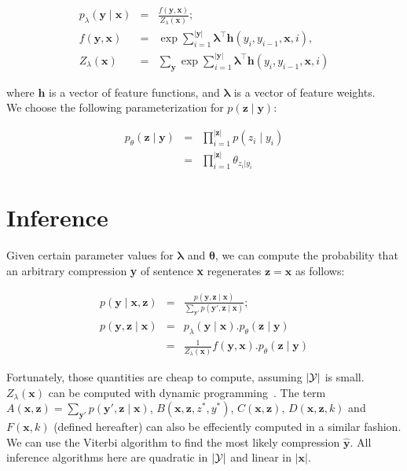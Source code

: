 \documentclass[11pt,onecolumn]{article}
\begin{document}
\begin{eqnarray}
p_\lambda(\mathbf{y}\mid\mathbf{x}) &=& \frac{f(\mathbf{y}, \mathbf{x})}{Z_\lambda(\mathbf{x})}; \\
f(\mathbf{y}, \mathbf{x}) &=& \exp \sum_{i=1}^{|\mathbf{y}|} \boldsymbol{\lambda}^\top \mathbf{h}(y_i, y_{i-1}, \mathbf{x}, i), \\
Z_\lambda(\mathbf{x}) &=& \sum_\mathbf{y} \exp \sum_{i=1}^{|\mathbf{y}|} \boldsymbol{\lambda}^\top \mathbf{h}(y_i, y_{i-1}, \mathbf{x}, i)
\end{eqnarray}

where $\mathbf{h}$ is a vector of feature functions, and $\boldsymbol{\lambda}$ is a vector of feature weights.\\

We choose the following parameterization for $p(\mathbf{z} \mid \mathbf{y})$:

\begin{eqnarray}
p_\theta(\mathbf{z} \mid \mathbf{y}) &=& \prod_{i=1}^{|\mathbf{z}|} p(z_i\mid y_i) \\
 &=& \prod_{i=1}^{|\mathbf{z}|} \theta_{z_i|y_i}
\end{eqnarray}

\section{Inference}
\label{sec:inference}
Given certain parameter values for $\boldsymbol{\lambda}$ and $\boldsymbol{\theta}$, we can compute the probability that an arbitrary compression \textbf{y} of sentence \textbf{x} regenerates $\mathbf{z} = \mathbf{x}$ as follows:

\begin{eqnarray}
p(\mathbf{y}\mid\mathbf{x}, \mathbf{z}) &=& \frac{p(\mathbf{y}, \mathbf{z} \mid \mathbf{x})}{\sum_{\mathbf{y'}} p(\mathbf{y'}, \mathbf{z} \mid \mathbf{x})}; \\
p(\mathbf{y}, \mathbf{z} \mid \mathbf{x}) &=& p_\lambda(\mathbf{y}\mid\mathbf{x}).p_\theta(\mathbf{z}\mid\mathbf{y}) \\
&=& \frac{1}{Z_\lambda(\mathbf{x})}f(\mathbf{y}, \mathbf{x}).p_\theta(\mathbf{z}\mid\mathbf{y})
\end{eqnarray}

Fortunately, those quantities are cheap to compute, assuming $|\cal{Y}|$ is small. $Z_\lambda(\mathbf{x})$ can be computed with dynamic programming~\cite{sha:03}. The term $A(\mathbf{x},\mathbf{z}) = \sum_{\mathbf{y'}} p(\mathbf{y'}, \mathbf{z} \mid \mathbf{x})$, $B(\mathbf{x}, \mathbf{z}, z^*, y^*)$, $C(\mathbf{x}, \mathbf{z})$, $D(\mathbf{x}, \mathbf{z}, k)$ and $F(\mathbf{x}, k)$ (defined hereafter) can also be effeciently computed in a similar fashion. We can use the Viterbi algorithm to find the most likely compression $\hat{\mathbf{y}}$. All inference algorithms here are quadratic in $|\cal{Y}|$ and linear in $|\mathbf{x}|$.
\end{document}
